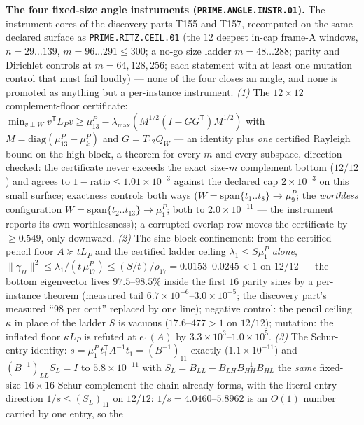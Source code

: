 \documentclass[11pt,a4paper]{article}
\begin{document}
\par\smallskip\noindent\textbf{The four fixed-size angle instruments
(\texttt{PRIME.ANGLE.INSTR.01}).}
The instrument cores of the discovery parts T155 and T157, recomputed on
the same declared surface as \texttt{PRIME.RITZ.CEIL.01} (the $12$
deepest in-cap frame-A windows, $n=29\ldots139$, $m=96\ldots291\le300$;
a no-go size ladder $m=48\ldots288$; parity and Dirichlet controls at
$m=64,128,256$; each statement with at least one mutation control that
must fail loudly) --- none of the four closes an angle, and none is
promoted as anything but a per-instance instrument. \emph{(1)} The
$12\times12$ complement-floor certificate:
$\min_{v\perp W}v^{\mathsf T}L_Pv\ge\mu^P_{13}-\lambda_{\max}(M^{1/2}
(I-GG^{\mathsf T})M^{1/2})$ with $M=\mathrm{diag}(\mu^P_{13}-\mu^P_k)$
and $G=T_{12}Q_W$ --- an identity plus \emph{one} certified Rayleigh
bound on the high block, a theorem for every $m$ and every subspace,
direction checked: the certificate never exceeds the exact size-$m$
complement bottom ($12/12$) and agrees to $1-\mathrm{ratio}\le1.01
\times10^{-3}$ against the declared cap $2\times10^{-3}$ on this small
surface; exactness controls both ways ($W=\mathrm{span}\{t_1..t_8\}\to
\mu^P_9$; the \emph{worthless} configuration $W=\mathrm{span}
\{t_2..t_{13}\}\to\mu^P_1$; both to $2.0\times10^{-11}$ --- the
instrument reports its own worthlessness); a corrupted overlap row moves
the certificate by $\ge0.549$, only downward. \emph{(2)} The sine-block
confinement: from the certified pencil floor $A\succeq tL_P$ and the
certified ladder ceiling $\lambda_1\le S\mu^P_1$ \emph{alone},
$\|\gamma_H\|^2\le\lambda_1/(t\,\mu^P_{17})\le(S/t)/\rho_{17}
=0.0153$--$0.0245<1$ on $12/12$ --- the bottom eigenvector lives
$97.5$--$98.5\%$ inside the first $16$ parity sines by a per-instance
theorem (measured tail $6.7\times10^{-6}$--$3.0\times10^{-5}$; the
discovery part's measured ``$98$ per cent'' replaced by one line);
negative control: the pencil ceiling $\kappa$ in place of the ladder $S$
is vacuous ($17.6$--$477>1$ on $12/12$); mutation: the inflated floor
$\kappa L_P$ is refuted at $e_1(A)$ by $3.3\times10^{3}$--$1.0\times
10^{5}$. \emph{(3)} The Schur-entry identity:
$s=\mu^P_1\,t_1^{\mathsf T}A^{-1}t_1=(B^{-1})_{11}$ exactly
($1.1\times10^{-11}$) and $(B^{-1})_{LL}S_L=I$ to $5.8\times10^{-11}$
with $S_L=B_{LL}-B_{LH}B_{HH}^{-1}B_{HL}$ the \emph{same} fixed-size
$16\times16$ Schur complement the chain already forms, with the
literal-entry direction $1/s\le(S_L)_{11}$ on $12/12$:
$1/s=4.0460$--$5.8962$ is an $O(1)$ number carried by one entry, so the
\end{document}
